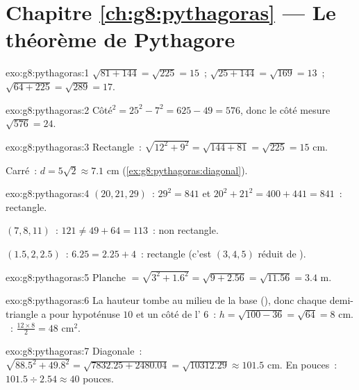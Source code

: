 \section*{Chapitre \ref{ch:g8:pythagoras} --- Le théorème de Pythagore}

\begin{solution}{exo:g8:pythagoras:1}
$\sqrt{81 + 144} = \sqrt{225} = 15$~; \quad
$\sqrt{25 + 144} = \sqrt{169} = 13$~; \quad
$\sqrt{64 + 225} = \sqrt{289} = 17$.
\end{solution}

\begin{solution}{exo:g8:pythagoras:2}
Côté$^2 = 25^2 - 7^2 = 625 - 49 = 576$, donc le côté mesure
$\sqrt{576} = 24$.
\end{solution}

\begin{solution}{exo:g8:pythagoras:3}
Rectangle~: $\sqrt{12^2 + 9^2} = \sqrt{144 + 81} = \sqrt{225} = 15$
cm.

Carré~: $d = 5\sqrt2 \approx 7.1$ cm
(\cref{ex:g8:pythagoras:diagonal}).
\end{solution}

\begin{solution}{exo:g8:pythagoras:4}
$(20, 21, 29)$~: $29^2 = 841$ et $20^2 + 21^2 = 400 + 441 = 841$~:
rectangle.

$(7, 8, 11)$~: $121 \neq 49 + 64 = 113$~: non rectangle.

$(1.5, 2, 2.5)$~: $6.25 = 2.25 + 4$~: rectangle (c'est
$(3,4,5)$ réduit de ).
\end{solution}

\begin{solution}{exo:g8:pythagoras:5}
Planche $= \sqrt{3^2 + 1.6^2} = \sqrt{9 + 2.56} = \sqrt{11.56} = 3.4$
m.
\end{solution}

\begin{solution}{exo:g8:pythagoras:6}
La hauteur tombe au milieu de la base (), donc chaque
demi-triangle a pour hypoténuse $10$ et un côté de l'
$6$~: $h = \sqrt{100 - 36} = \sqrt{64} = 8$ cm. ~:
$\frac{12 \times 8}{2} = 48$ cm$^2$.
\end{solution}

\begin{solution}{exo:g8:pythagoras:7}
Diagonale~: $\sqrt{88.5^2 + 49.8^2} = \sqrt{7832.25 + 2480.04}
= \sqrt{10312.29} \approx 101.5$ cm. En pouces~:
$101.5 \div 2.54 \approx 40$ pouces.
\end{solution}

